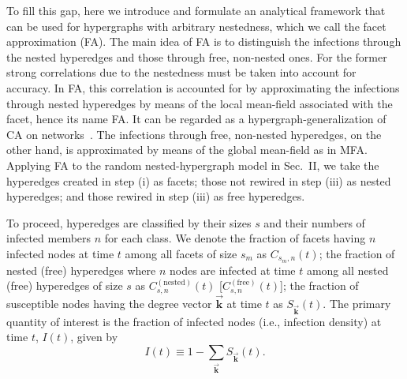 \documentclass[aps,pre,twocolumn,nofootinbib,superscriptaddress,showpacs,showkeys]{revtex4-1}
\begin{document}
To fill this gap, here we introduce and formulate an analytical framework that can be used for hypergraphs with arbitrary nestedness, which we call the facet approximation (FA). 
The main idea of FA is to distinguish the infections through the nested hyperedges and those through free, non-nested ones. 
For the former strong correlations due to the nestedness must be taken into account for accuracy. In FA, this correlation is accounted for by approximating the infections through nested hyperedges by means of the local mean-field associated with the facet, hence its name FA. It can be regarded as a hypergraph-generalization of CA on networks~\cite{propagation}. The infections through free, non-nested hyperedges, on the other hand, is approximated by means of the global mean-field as in MFA.  
Applying FA to the random nested-hypergraph model in Sec.~II, 
we take the hyperedges created in step (i) as facets; those not rewired in step (iii) as nested hyperedges; and those rewired in step (iii) as free hyperedges.

To proceed, hyperedges are classified by their sizes $s$ and their numbers of infected members $n$ for each class.  We denote 
the fraction of facets having $n$ infected nodes at time $t$ among all facets of size $s_m$ as $C_{s_m,n}(t)$; the fraction of nested (free) hyperedges where $n$ nodes are infected at time $t$ among all nested (free) hyperedges of size $s$ as $C^{(\mathrm{nested})}_{s,n}(t)$ [$C^{(\mathrm{free})}_{s,n}(t)$]; the fraction of susceptible nodes having the degree vector $\vec{\mathbf{k}}$ at time $t$ as $S_{\vec{\mathbf{k}}}(t)$. The primary quantity of interest is the  
fraction of infected nodes (i.e., infection density) at time $t$, $I(t)$, given by 
\begin{equation}
I(t)\equiv 1-\sum_{\vec{\mathbf{k}}} S_{\vec{\mathbf{k}}}(t).
\label{eq:eqqq}
\end{equation} 
\end{document}
